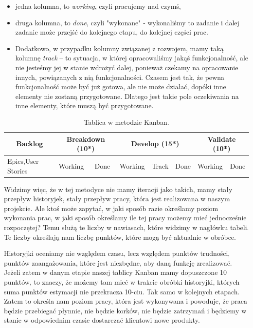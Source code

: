 \begin{itemize}
	\item jedna kolumna, to \textit{working}, czyli pracujemy nad czymś,
	\item druga kolumna, to \textit{done}, czyli "wykonane" - wykonaliśmy to zadanie
	i dalej zadanie może przejść do kolejnego etapu, do kolejnej części prac.
	\item Dodatkowo, w przypadku kolumny związanej z rozwojem, mamy taką kolumnę \textit{track}
	– to sytuacja, w której opracowaliśmy jakąś funkcjonalność,
	ale nie jesteśmy jej w stanie wdrożyć dalej, ponieważ czekamy na opracowanie innych,
	powiązanych z nią funkcjonalności.
	Czasem jest tak, że pewna funkcjonalność może być już gotowa, ale nie może działać,
	dopóki inne elementy nie zostaną przygotowane.
	Dlatego jest takie pole oczekiwania na inne elementy, które muszą być przygotowane.
\end{itemize}

\begin{table}
	\centering\caption{Tablica w metodzie Kanban.}\label{tabela:kanban}
	\begin{tabular}{*8{l} }%
	\toprule
	\multicolumn{1}{|c|}{\textbf{Backlog}} &\multicolumn{2}{|c|}{\textbf{Breakdown (10*)}} & \multicolumn{3}{|c|}{\textbf{Develop (15*)}} & \multicolumn{2}{|c|}{\textbf{Validate (10*)}} \\
	\midrule
	Epics,User Stories & Working
	& Done & Working & Track & Done & Working & Done \\
	\bottomrule
	\end{tabular}
\end{table}

Widzimy więc, że w tej metodyce nie mamy iteracji jako takich, mamy stały przepływ historyjek,
stały przepływ pracy, która jest realizowana w naszym projekcie.
Ale ktoś może zapytać, w jaki sposób razie określamy poziom wykonania prac, w jaki sposób określamy
ile tej pracy możemy mieć jednocześnie rozpoczętej?
Temu służą te liczby w nawiasach, które widzimy w nagłówku tabeli.
Te liczby określają nam liczbę punktów, które mogą być aktualnie w obróbce.

Historyjki oceniamy nie względem czasu, lecz względem punktów trudności,
punktów zaangażowania, które jest niezbędne, aby daną funkcję zrealizować.
Jeżeli zatem w danym etapie naszej tablicy Kanban mamy dopuszczone 10 punktów,
to znaczy, że możemy tam mieć w trakcie obróbki historyjki,
których suma punktów estymacji nie przekracza 10-ciu. Tak samo w kolejnych etapach.
Zatem to określa nam poziom pracy, która jest wykonywana i powoduje, że praca będzie przebiegać płynnie,
nie będzie korków, nie będzie zatrzymań i będziemy w stanie w odpowiednim czasie dostarczać klientowi
nowe produkty.

